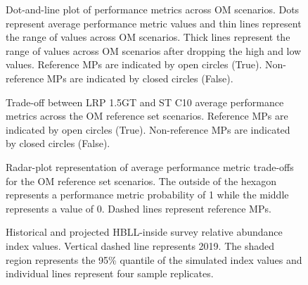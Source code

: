 \documentclass[11pt]{book}
\begin{document}
\begin{figure}[htb]

{\centering {} 

}

\caption{Dot-and-line plot of performance metrics across OM scenarios. Dots represent average performance metric values and thin lines represent the range of values across OM scenarios. Thick lines represent the range of values across OM scenarios after dropping the high and low values. Reference MPs are indicated by open circles (True). Non-reference MPs are indicated by closed circles (False).}\label{fig:dot-lines}
\end{figure}
\clearpage
\begin{figure}[htb]

{\centering {} 

}

\caption{Trade-off between LRP 1.5GT and ST C10 average performance metrics across the OM reference set scenarios. Reference MPs are indicated by open circles (True). Non-reference MPs are indicated by closed circles (False).}\label{fig:tradeoff-reference}
\end{figure}
\clearpage
\begin{figure}[htb]

{\centering {} 

}

\caption{Radar-plot representation of average performance metric trade-offs for the OM reference set scenarios. The outside of the hexagon represents a performance metric probability of 1 while the middle represents a value of 0. Dashed lines represent reference MPs.}\label{fig:spider-satisficed-mps-avg}
\end{figure}
\clearpage
\begin{figure}[htb]

{\centering {} 

}

\caption{Historical and projected HBLL-inside survey relative abundance index values. Vertical dashed line represents 2019. The shaded region represents the 95\% quantile of the simulated index values and individual lines represent four sample replicates.}\label{fig:proj-index}
\end{figure}
\clearpage
\end{document}
